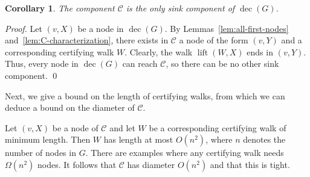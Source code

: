 \documentclass[oribibl,envcountsect,envcountsame]{llncs}
\newtheorem{corol}[theorem]{Corollary}
\DeclareMathOperator{\dec}{dec}
\DeclareMathOperator{\lt}{lift}
\newcommand{\C}{\mathcal C}
\begin{document}
\begin{corol}
The component $\C$ is the only sink component of $\dec(G)$.
\end{corol}
\begin{proof}
Let $(v, X)$ be a node in $\dec(G)$. By Lemmas~\ref{lem:all-first-nodes} 
and~\ref{lem:C-characterization}, there exists in $\C$ a node 
of the form $(v, Y)$ and a
corresponding certifying walk $W$. Clearly, the walk $\lt(W, X)$ ends 
in $(v, Y)$. Thus, every node in $\dec(G)$ can reach $\C$, so there
can be no other sink component. 
\qed\end{proof}

Next, we give a bound on the length of certifying walks, from
which we can deduce a bound on the diameter of $\C$.
\begin{theorem}
Let $(v, X)$ be a node of $\C$ and let $W$ be a corresponding certifying walk 
of minimum length. Then $W$ has length at most $O(n^2)$, where $n$ denotes 
the number of nodes in $G$. There are examples where any certifying walk
needs $\Omega(n^2)$ nodes. It follows that $\C$ has diameter $O(n^2)$
and that this is tight.
\end{theorem}
\end{document}
